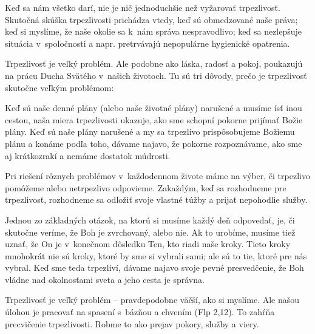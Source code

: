 \def\velkostpisma{10}
\def\velkostriadku{12.5}



Keď sa nám všetko darí, nie je nič jednoduchšie než vyžarovať trpezlivosť. Skutočná skúška trpezlivosti prichádza vtedy, keď sú obmedzované naše práva; keď si myslíme, že naše okolie sa k~nám správa nespravodlivo; keď sa nezlepšuje situácia v~spoločnosti a napr. pretrvávajú nepopulárne hygienické opatrenia.

Trpezlivosť je veľký problém. Ale podobne ako láska, radosť a pokoj, poukazujú na prácu Ducha Svätého v~našich životoch. Tu sú tri dôvody, prečo je trpezlivosť skutočne veľkým problémom:


Keď sú naše denné plány (alebo naše životné plány) narušené a musíme ísť inou cestou, naša miera trpezlivosti ukazuje, ako sme schopní pokorne prijímať Božie plány. Keď sú naše plány narušené a my sa trpezlivo prispôsobujeme Božiemu plánu a konáme podľa toho, dávame najavo, že pokorne rozpoznávame, ako sme aj krátkozrakí a nemáme dostatok múdrosti.


Pri riešení rôznych problémov v~každodennom živote máme na výber, či trpezlivo pomôžeme alebo netrpezlivo odpovieme. Zakaždým, keď sa rozhodneme pre trpezlivosť, rozhodneme sa odložiť svoje vlastné túžby a prijať nepohodlie služby.


Jednou zo základných otázok, na ktorú si musíme každý deň odpovedať, je, či skutočne veríme, že Boh je zvrchovaný, alebo nie. Ak to urobíme, musíme tiež uznať, že On je v~konečnom dôsledku Ten, kto riadi naše kroky. Tieto kroky mnohokrát nie sú kroky, ktoré by sme si vybrali sami; ale sú to tie, ktoré pre nás vybral. Keď sme teda trpezliví, dávame najavo svoje pevné presvedčenie, že Boh vládne nad okolnosťami sveta a jeho cesta je správna.

Trpezlivosť je veľký problém -- pravdepodobne väčší, ako si myslíme. Ale našou úlohou je pracovať na spasení s~bázňou a chvením (Flp 2,12). To zahŕňa precvičenie trpezlivosti. Robme to ako prejav pokory, služby a viery.

